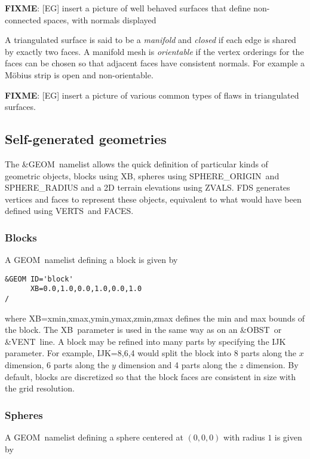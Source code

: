\documentclass[12pt]{article}
\begin{document}
\textbf{FIXME}: [EG] insert a picture of well behaved surfaces that define non-connected spaces, with normals displayed

A triangulated surface is said to be a \textit{manifold} and \textit{closed} if each edge is shared by exactly two faces.
A manifold mesh is \textit{orientable} if the vertex orderings for the faces can be chosen so that adjacent faces
have consistent normals. For example a Möbius strip is open and non-orientable.

\textbf{FIXME}: [EG] insert a picture of various common types of flaws in triangulated surfaces.

\subsection{Self-generated geometries}

The {\ct \&GEOM}\ namelist allows the quick definition of particular kinds of geometric objects, blocks using {\ct XB}, spheres using {\ct SPHERE\_ORIGIN}\ and {\ct SPHERE\_RADIUS}
and a 2D terrain elevations using {\ct ZVALS}. FDS generates vertices and faces to represent these objects, equivalent to what would have been defined using {\ct VERTS}\ and {\ct FACES}.

\subsubsection{Blocks}
A {\ct GEOM}\ namelist defining a block is given by

\begin{verbatim}
&GEOM ID='block'
      XB=0.0,1.0,0.0,1.0,0.0,1.0
/
\end{verbatim}

\noindent where {\ct XB=xmin,xmax,ymin,ymax,zmin,zmax} defines the min and max bounds of the block.
The {\ct XB}\ parameter is used in the same way as on an {\ct \&OBST}\ or {\ct \&VENT}\ line.
A block may be refined into many parts by specifying the {\ct IJK} parameter.
For example, {\ct IJK=8,6,4} would split the block into 8 parts along the $x$ dimension,
6 parts along the $y$ dimension and 4 parts along the $z$ dimension.
By default, blocks are discretized so that the block faces are consistent in size with the grid resolution.

\subsubsection{Spheres}
A {\ct GEOM}\ namelist defining a sphere centered at $(0,0,0)$ with radius $1$ is given by
\end{document}
